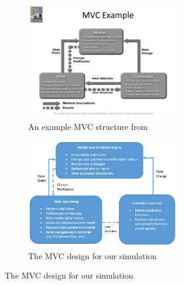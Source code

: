 \documentclass{article}
\begin{document}
   \begin{figure}[p]
   	\centering
   	   	\begin{subfigure}{\textwidth}
   	   		\centering
   	   		\includegraphics[width=0.75\textwidth]{MVCExample.jpg}
   	   		\caption{An example MVC structure from \cite{bass2007software}}
   	   	\end{subfigure}	
   	   	\par \bigskip
   	\begin{subfigure}{\textwidth}
   		\centering
   		\includegraphics[width=0.75\textwidth]{mvc}
   		\caption{The MVC design for our simulation}
   		\label{OurMvc}
   	\end{subfigure}
   	

   	   \end{figure}
   	
\end{document}
